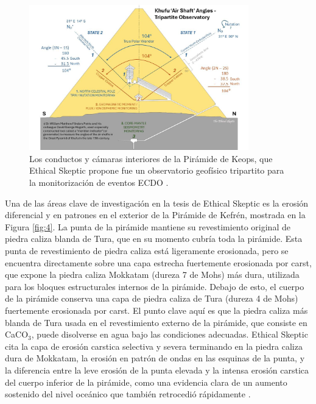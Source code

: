 \documentclass[10pt,twocolumn,letterpaper]{article}
\begin{document}
\begin{figure}[t]
\begin{center}
\includegraphics[width=0.85\textwidth]{shafts.jpg}
\end{center}
   \caption{Los conductos y cámaras interiores de la Pirámide de Keops, que Ethical Skeptic propone fue un observatorio geofísico tripartito para la monitorización de eventos ECDO \cite{28}.}
\label{fig:5}
\end{figure}

Una de las áreas clave de investigación en la tesis de Ethical Skeptic es la erosión diferencial y en patrones en el exterior de la Pirámide de Kefrén, mostrada en la Figura \ref{fig:4}. La punta de la pirámide mantiene su revestimiento original de piedra caliza blanda de Tura, que en su momento cubría toda la pirámide. Esta punta de revestimiento de piedra caliza está ligeramente erosionada, pero se encuentra directamente sobre una capa estrecha fuertemente erosionada por carst, que expone la piedra caliza Mokkatam (dureza 7 de Mohs) más dura, utilizada para los bloques estructurales internos de la pirámide. Debajo de esto, el cuerpo de la pirámide conserva una capa de piedra caliza de Tura (dureza 4 de Mohs) fuertemente erosionada por carst. El punto clave aquí es que la piedra caliza más blanda de Tura usada en el revestimiento externo de la pirámide, que consiste en CaCO$_3$, puede disolverse en agua bajo las condiciones adecuadas. Ethical Skeptic cita la capa de erosión carstica selectiva y severa terminando en la piedra caliza dura de Mokkatam, la erosión en patrón de ondas en las esquinas de la punta, y la diferencia entre la leve erosión de la punta elevada y la intensa erosión carstica del cuerpo inferior de la pirámide, como una evidencia clara de un aumento sostenido del nivel oceánico que también retrocedió rápidamente \cite{27}.
\end{document}
